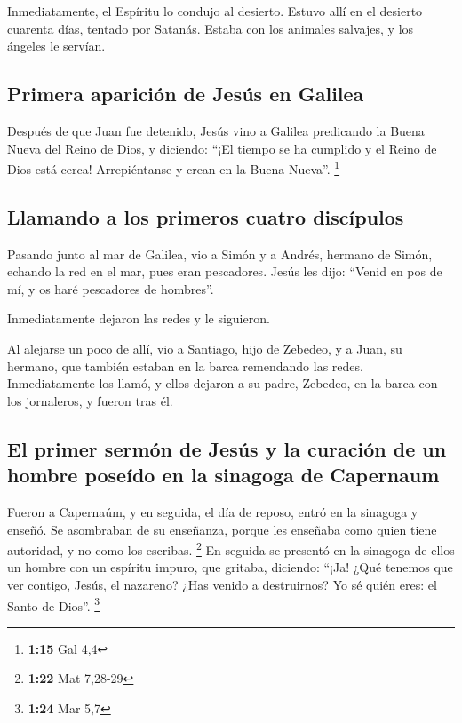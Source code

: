  Inmediatamente, el Espíritu lo condujo al desierto.
 Estuvo allí en el desierto cuarenta días, tentado por
Satanás. Estaba con los animales salvajes, y los ángeles le servían.

\hypertarget{primera-apariciuxf3n-de-jesuxfas-en-galilea}{%
\subsection{Primera aparición de Jesús en
Galilea}\label{primera-apariciuxf3n-de-jesuxfas-en-galilea}}

 Después de que Juan fue detenido, Jesús vino a Galilea
predicando la Buena Nueva del Reino de Dios,  y diciendo:
``¡El tiempo se ha cumplido y el Reino de Dios está cerca! Arrepiéntanse
y crean en la Buena Nueva''. \footnote{\textbf{1:15} Gal 4,4}

\hypertarget{llamando-a-los-primeros-cuatro-discuxedpulos}{%
\subsection{Llamando a los primeros cuatro
discípulos}\label{llamando-a-los-primeros-cuatro-discuxedpulos}}

 Pasando junto al mar de Galilea, vio a Simón y a Andrés,
hermano de Simón, echando la red en el mar, pues eran pescadores.
 Jesús les dijo: ``Venid en pos de mí, y os haré
pescadores de hombres''.

 Inmediatamente dejaron las redes y le siguieron.

 Al alejarse un poco de allí, vio a Santiago, hijo de
Zebedeo, y a Juan, su hermano, que también estaban en la barca
remendando las redes.  Inmediatamente los llamó, y ellos
dejaron a su padre, Zebedeo, en la barca con los jornaleros, y fueron
tras él.

\hypertarget{el-primer-sermuxf3n-de-jesuxfas-y-la-curaciuxf3n-de-un-hombre-poseuxeddo-en-la-sinagoga-de-capernaum}{%
\subsection{El primer sermón de Jesús y la curación de un hombre poseído
en la sinagoga de
Capernaum}\label{el-primer-sermuxf3n-de-jesuxfas-y-la-curaciuxf3n-de-un-hombre-poseuxeddo-en-la-sinagoga-de-capernaum}}

 Fueron a Capernaúm, y en seguida, el día de reposo,
entró en la sinagoga y enseñó.  Se asombraban de su
enseñanza, porque les enseñaba como quien tiene autoridad, y no como los
escribas. \footnote{\textbf{1:22} Mat 7,28-29}  En
seguida se presentó en la sinagoga de ellos un hombre con un espíritu
impuro, que gritaba,  diciendo: ``¡Ja! ¿Qué tenemos que
ver contigo, Jesús, el nazareno? ¿Has venido a destruirnos? Yo sé quién
eres: el Santo de Dios''. \footnote{\textbf{1:24} Mar 5,7}

